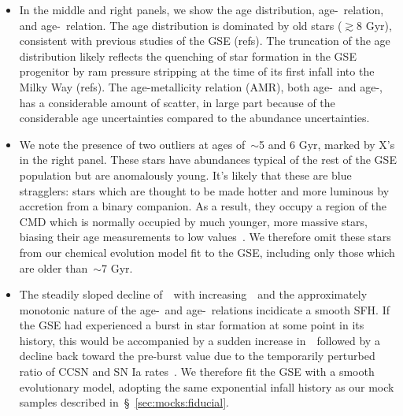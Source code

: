 \documentclass[ms.tex]{subfiles}
\begin{document}
\begin{itemize}
	\item In the middle and right panels, we show the age distribution,
	age-\feh~relation, and age-\afe~relation.
	The age distribution is dominated by old stars ($\gtrsim$8 Gyr), consistent
	with previous studies of the GSE (refs).
	The truncation of the age distribution likely reflects the quenching of
	star formation in the GSE progenitor by ram pressure stripping at the time
	of its first infall into the Milky Way (refs).
	The age-metallicity relation (AMR), both age-\feh~and age-\afe, has a
	considerable amount of scatter, in large part because of the considerable
	age uncertainties compared to the abundance uncertainties.

	\item We note the presence of two outliers at ages of~$\sim$5 and 6 Gyr,
	marked by X's in the right panel.
	These stars have abundances typical of the rest of the GSE population but
	are anomalously young.
	It's likely that these are blue stragglers: stars which are thought to be
	made hotter and more luminous by accretion from a binary companion.
	As a result, they occupy a region of the CMD which is normally occupied by
	much younger, more massive stars, biasing their age measurements to low
	values~\citep[e.g.][]{Bond1971, Stryker1993}.
	We therefore omit these stars from our chemical evolution model fit to the
	GSE, including only those which are older than~$\sim$7 Gyr.

	\item The steadily sloped decline of~\afe~with increasing~\feh~and the
	approximately monotonic nature of the age-\feh~and age-\afe~relations
	incidicate a smooth SFH.
	If the GSE had experienced a burst in star formation at some point in its
	history, this would be accompanied by a sudden increase in~\afe~followed by
	a decline back toward the pre-burst value due to the temporarily perturbed
	ratio of CCSN and SN Ia rates~\citep{Johnson2020}.
	We therefore fit the GSE with a smooth evolutionary model, adopting the
	same exponential infall history as our mock samples described
	in~\S~\ref{sec:mocks:fiducial}.


\end{itemize}
\end{document}
